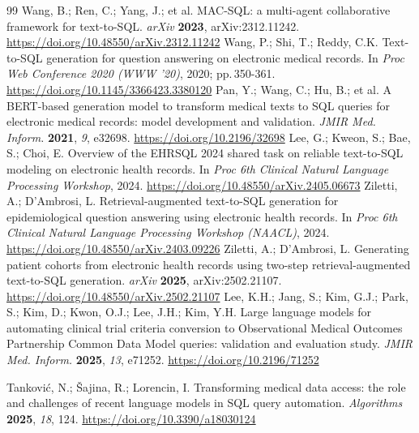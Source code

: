 \documentclass[applsci,article,submit,pdftex,oneauthor]{Definitions/mdpi}
\newcommand{\doilink}[1]{\begingroup\urlstyle{same}\url{#1}\endgroup}
\begin{document}
\begin{thebibliography}{99}
 Wang, B.; Ren, C.; Yang, J.; et al. MAC-SQL: a multi-agent collaborative framework for text-to-SQL. \textit{arXiv} \textbf{2023}, arXiv:2312.11242. \doilink{https://doi.org/10.48550/arXiv.2312.11242}
 Wang, P.; Shi, T.; Reddy, C.K. Text-to-SQL generation for question answering on electronic medical records. In \textit{Proc Web Conference 2020 (WWW '20)}, 2020; pp.\,350-361. \doilink{https://doi.org/10.1145/3366423.3380120}
 Pan, Y.; Wang, C.; Hu, B.; et al. A BERT-based generation model to transform medical texts to SQL queries for electronic medical records: model development and validation. \textit{JMIR Med. Inform.} \textbf{2021}, \textit{9}, e32698. \doilink{https://doi.org/10.2196/32698}
 Lee, G.; Kweon, S.; Bae, S.; Choi, E. Overview of the EHRSQL 2024 shared task on reliable text-to-SQL modeling on electronic health records. In \textit{Proc 6th Clinical Natural Language Processing Workshop}, 2024. \doilink{https://doi.org/10.48550/arXiv.2405.06673}
 Ziletti, A.; D'Ambrosi, L. Retrieval-augmented text-to-SQL generation for epidemiological question answering using electronic health records. In \textit{Proc 6th Clinical Natural Language Processing Workshop (NAACL)}, 2024. \doilink{https://doi.org/10.48550/arXiv.2403.09226}
 Ziletti, A.; D'Ambrosi, L. Generating patient cohorts from electronic health records using two-step retrieval-augmented text-to-SQL generation. \textit{arXiv} \textbf{2025}, arXiv:2502.21107. \doilink{https://doi.org/10.48550/arXiv.2502.21107}
 Lee, K.H.; Jang, S.; Kim, G.J.; Park, S.; Kim, D.; Kwon, O.J.; Lee, J.H.; Kim, Y.H. Large language models for automating clinical trial criteria conversion to Observational Medical Outcomes Partnership Common Data Model queries: validation and evaluation study. \textit{JMIR Med. Inform.} \textbf{2025}, \textit{13}, e71252. \doilink{https://doi.org/10.2196/71252}

 Tankovi\'{c}, N.; \v{S}ajina, R.; Lorencin, I. Transforming medical data access: the role and challenges of recent language models in SQL query automation. \textit{Algorithms} \textbf{2025}, \textit{18}, 124. \doilink{https://doi.org/10.3390/a18030124}


\end{thebibliography}
\end{document}
